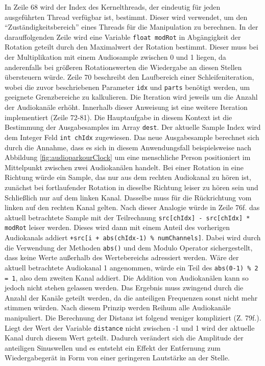 In Zeile 68 wird der Index des Kernelthreads, der eindeutig für jeden ausgeführten Thread verfügbar ist, bestimmt. Dieser wird verwendet, um den \enquote{Zuständigkeitsbereich} eines Threads für die Manipulation zu berechnen. In der darauffolgenden Zeile wird eine Variable \texttt{float modRot} in Abgängigkeit der Rotation geteilt durch den Maximalwert der Rotation bestimmt. Dieser muss bei der Multiplikation mit einem Audiosample zwischen 0 und 1 liegen, da anderenfalls bei größeren Rotationswerten die Wiedergabe an diesen Stellen übersteuern würde.
Zeile 70 beschreibt den Laufbereich einer Schleifeniteration, wobei die zuvor beschriebenen Parameter \texttt{idx} und \texttt{parts} benötigt werden, um geeignete Grenzbereiche zu kalkulieren. Die Iteration wird jeweils um die Anzahl der Audiokanäle erhöht.
Innerhalb dieser Anweisung ist eine weitere Iteration implementiert (Zeile 72-81). Die Hauptaufgabe in diesem Kontext ist die Bestimmung der Ausgabesamples im Array \texttt{dest}. Der aktuelle Sample Index wird dem Integer Feld \texttt{int chIdx} zugewiesen. Das neue Ausgabesample berechnet sich durch die Annahme, dass es sich in diesem Anwendungsfall beispielsweise nach Abbildung \ref{fig:audioparkourClock} um eine menschliche Person positioniert im Mittelpunkt zwischen zwei Audiokanälen handelt. Bei einer Rotation in eine Richtung würde ein Sample, das nur aus dem rechten Audiokanal zu hören ist, zunächst bei fortlaufender Rotation in dieselbe Richtung leiser zu hören sein und Schließlich nur auf dem linken Kanal. Dasselbe muss für die Rückrichtung vom linken auf den rechten Kanal gelten. Nach dieser Analogie würde in Zeile 76f. das aktuell betrachtete Sample mit der Teilrechnung \texttt{src[chIdx] - src[chIdx] * modRot} leiser werden. Dieses wird dann mit einem Anteil des vorherigen Audiokanals addiert \texttt{+src[i + abs(chIdx-1) \% numChannels]}. Dabei wird durch die Verwendung der Methoden \texttt{abs()} und dem Modulo Operator sichergestellt, dass keine Werte außerhalb des Wertebereichs adressiert werden. Wäre der aktuell betrachtete Audiokanal 1 angenommen, würde ein Teil des \texttt{abs(0-1) \% 2 = 1}, also dem zweiten Kanal addiert. Die Addition von Audiokanälen kann so jedoch nicht stehen gelassen werden. Das Ergebnis muss zwingend durch die Anzahl der Kanäle geteilt werden, da die anteiligen Frequenzen sonst nicht mehr stimmen würden. Nach diesem Prinzip werden Reihum alle Audiokanäle manipuliert. Die Berechnung der Distanz ist folgend weniger kompliziert (Z. 79f.). Liegt der Wert der Variable \texttt{distance} nicht zwischen -1 und 1 wird der aktuelle Kanal durch diesem Wert geteilt. Dadurch verändert sich die Amplitude der anteiligen Sinuswellen und es entsteht ein Effekt der Entfernung zum Wiedergabegerät in Form von einer geringeren Lautstärke an der Stelle.

